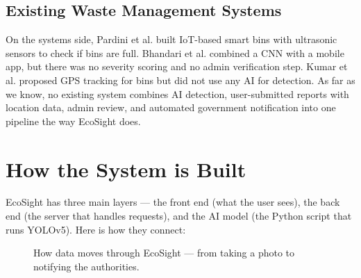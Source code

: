 \documentclass[conference]{IEEEtran}
\begin{document}
\subsection{Existing Waste Management Systems}
On the systems side, Pardini et al. \cite{pardini2019iot} built IoT-based smart bins with ultrasonic sensors to check if bins are full. Bhandari et al. \cite{bhandari2022smart} combined a CNN with a mobile app, but there was no severity scoring and no admin verification step. Kumar et al. \cite{kumar2020smart} proposed GPS tracking for bins but did not use any AI for detection. As far as we know, no existing system combines AI detection, user-submitted reports with location data, admin review, and automated government notification into one pipeline the way EcoSight does.

\section{How the System is Built}

EcoSight has three main layers — the front end (what the user sees), the back end (the server that handles requests), and the AI model (the Python script that runs YOLOv5). Here is how they connect:

\begin{figure}[H]
    \centering
    \caption{How data moves through EcoSight — from taking a photo to notifying the authorities.}
    \label{fig:architecture}
\end{figure}
\end{document}
